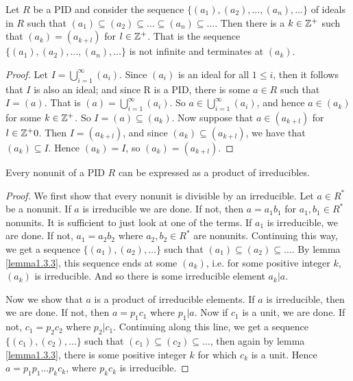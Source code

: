 \begin{lemma}\label{lemma1.3.3}
    Let $R$ be a PID and consider the sequence $\{(a_1),(a_2), \dots, (a_n), \dots\}$ of ideals in $R$ such that $(a_1) \subseteq (a_2) \subseteq \dots \subseteq (a_n)  \subseteq \dots$. Then there is a $k \in \mathbb{Z}^+$ such that $(a_k)=(a_{k+l})$ for $l \in \mathbb{Z}^+$. That is the sequence $\{(a_1),(a_2), \dots, (a_n), \dots\}$ is not infinite and terminates at $(a_k)$.
\end{lemma}
\begin{proof}
    Let $I=\bigcup_{i=1}^{\infty} (a_i)$. Since $(a_i)$ is an ideal for all $1 \leq i$, then it follows that $I$ is also an ideal; and since R is a PID, there is some $a \in R$ such that $I=(a)$. That is $(a)=\bigcup_{i=1}^{\infty} (a_i)$. So $a \in \bigcup_{i=1}^{\infty} (a_i)$, and hence $a \in (a_k)$ for some $k \in \mathbb{Z}^+$. So $I=(a) \subseteq (a_k)$. Now suppose that $a \in (a_{k+l})$ for $l \in \mathbb{Z}^+0$. Then $I=(a_{k+l})$, and since $(a_k) \subseteq (a_{k+l})$, we have that $(a_k) \subseteq I$. Hence $(a_k)=I$, so $(a_k)=(a_{k+l})$. 
\end{proof}

\begin{proposition}\label{proposition1.3.4}
    Every nonunit of a PID $R$ can be expressed as a product of irreducibles.
\end{proposition}
\begin{proof}
    We first show that every nonunit is divisible by an irreducible. Let $a \in R^*$ be a nonunit. If $a$ is irreducible we are done. If not, then $a=a_1b_1$ for $a_1,b_1 \in R^*$ nonunits. It is sufficient to just look at one of the terms. If $a_1$ is irreducible, we are done. If not, $a_1=a_2b_2$ where $a_2,b_2 \in R^*$ are nonunits. Continuing this way, we get a sequence $\{(a_1),(a_2), \dots\}$ such that $(a_1) \subseteq (a_2) \subseteq \dots$. By lemma \ref{lemma1.3.3}, this sequence ends at some $(a_k)$, i.e. for some positive integer $k$, $(a_k)$ is irreducible. And so there is some irreducible element $a_k|a$.
    
    Now we show that $a$ is a product of irreducible elements. If $a$ is irreducible, then we are done. If not, then $a=p_1c_1$ where $p_1|a$. Now if $c_1$ is a unit, we are done. If not, $c_1=p_2c_2$ where $p_2|c_1$. Continuing along this line, we get a sequence $\{(c_1),(c_2), \dots\}$ such that $(c_1) \subseteq (c_2) \subseteq \dots$, then again by lemma \ref{lemma1.3.3}, there is some positive integer $k$ for which $c_k$ is a unit. Hence $a=p_1p_1 \dots p_kc_k$, where $p_kc_k$ is irreducible.
\end{proof}

